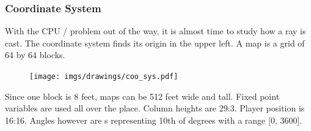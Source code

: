 \subsubsection{Coordinate System}
With the CPU / problem out of the way, it is almost time to study how a ray is cast. The coordinate system finds its origin in the upper left. A map is a grid of 64 by 64 blocks. 
\begin{figure}[H]
  \centering
 \texttt{[image: imgs/drawings/coo\_sys.pdf]}
\end{figure}
\par
Since one block is 8 feet, maps can be 512 feet wide and tall. Fixed point variables are used all over the place. Column heights are 29:3. Player position is 16:16. Angles however are s representing 10th of degrees with a range [0, 3600].

















